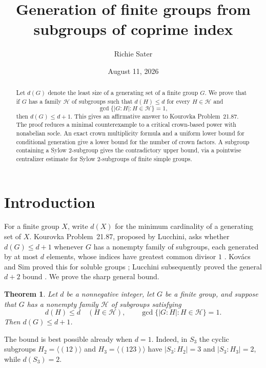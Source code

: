 \documentclass[11pt,reqno]{amsart}
\title[Subgroups of coprime index]{Generation of finite groups from subgroups of coprime index}
\author{Richie Sater}
\date{August 11, 2026}
\newtheorem{theorem}{Theorem}[section]
\theoremstyle{remark}
\newcommand{\gen}[1]{\langle #1\rangle}
\begin{document}
\begin{abstract}
Let $d(G)$ denote the least size of a generating set of a finite group $G$.
We prove that if $G$ has a family $\mathcal H$ of subgroups such that
$d(H)\leq d$ for every $H\in\mathcal H$ and
\[
  \gcd\{\lvert G:H\rvert:H\in\mathcal H\}=1,
\]
then $d(G)\leq d+1$.  This gives an affirmative answer to Kourovka
Problem~21.87.  The proof reduces a minimal counterexample to a critical
crown-based power with nonabelian socle.  An exact crown multiplicity formula
and a uniform lower bound for conditional generation give a lower bound for
the number of crown factors.  A subgroup containing a Sylow $2$-subgroup gives
the contradictory upper bound, via a pointwise centralizer estimate for Sylow
$2$-subgroups of finite simple groups.
\end{abstract}

\maketitle

\section{Introduction}

For a finite group $X$, write $d(X)$ for the minimum cardinality of a
generating set of $X$.  Kourovka Problem~21.87, proposed by Lucchini, asks
whether $d(G)\leq d+1$ whenever $G$ has a nonempty family of subgroups, each
generated by at most $d$ elements, whose indices have greatest common divisor
$1$ \cite[Problem 21.87, p.~177]{kourovka21}.  Kov\'acs and Sim proved this
for soluble groups
\cite[Theorem~2]{KovacsSim1991}; Lucchini subsequently proved the general
$d+2$ bound \cite{Lucchini2000}.  We prove the sharp general bound.

\begin{theorem}\label{thm:main}
Let $d$ be a nonnegative integer, let $G$ be a finite group, and suppose that
$G$ has a nonempty family $\mathcal H$ of subgroups satisfying
\[
 d(H)\leq d\quad(H\in\mathcal H),
 \qquad
 \gcd\{\lvert G:H\rvert:H\in\mathcal H\}=1.
\]
Then $d(G)\leq d+1$.
\end{theorem}

The bound is best possible already when $d=1$.  Indeed, in $S_3$ the cyclic
subgroups $H_2=\gen{(12)}$ and $H_3=\gen{(123)}$ have
$\lvert S_3:H_2\rvert=3$ and $\lvert S_3:H_3\rvert=2$, while $d(S_3)=2$.
\end{document}

